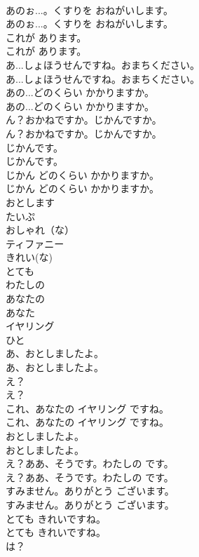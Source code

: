 \documentclass[8pt]{extreport}
\begin{document}
\begin{CJK}{UTF8}{min}
\\	あのぉ...。くすりを おねがいします。	
\\	あのぉ...。くすりを おねがいします。 
\\	これが あります。	
\\	これが あります。 
\\	あ...しょほうせんですね。おまちください。	
\\	あ...しょほうせんですね。おまちください。 
\\	あの...どのくらい かかりますか。	
\\	あの...どのくらい かかりますか。 
\\	ん？おかねですか。じかんですか。	
\\	ん？おかねですか。じかんですか。 
\\	じかんです。	
\\	じかんです。 
\\	じかん どのくらい かかりますか。	
\\	じかん どのくらい かかりますか。 
\\	おとします
\\	たいぷ
\\	おしゃれ（な）
\\	ティファニー
\\	きれい(な)
\\	とても
\\	わたしの
\\	あなたの
\\	あなた
\\	イヤリング
\\	ひと
\\	あ、おとしましたよ。	
\\	あ、おとしましたよ。 
\\	え？	
\\	え？ 
\\	これ、あなたの イヤリング ですね。	
\\	これ、あなたの イヤリング ですね。 
\\	おとしましたよ。	
\\	おとしましたよ。 
\\	え？ああ、そうです。わたしの です。	
\\	え？ああ、そうです。わたしの です。 
\\	すみません。ありがとう ございます。	
\\	すみません。ありがとう ございます。 
\\	とても きれいですね。	
\\	とても きれいですね。 
\\	は？	

\end{CJK}
\end{document}
